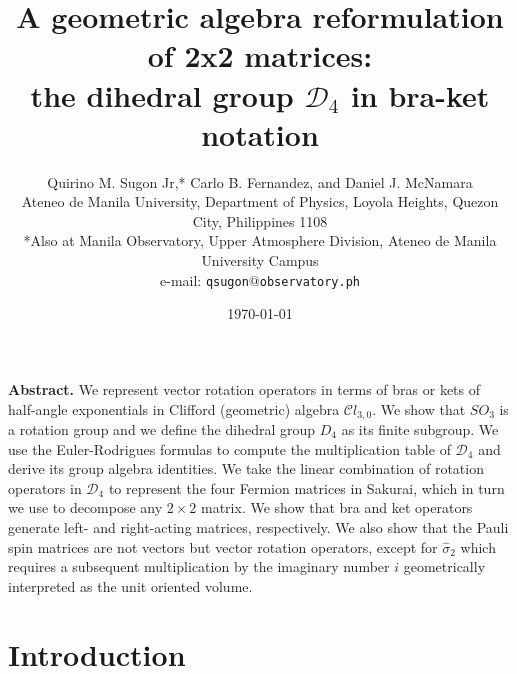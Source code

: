 \documentclass[11pt,twocolumn]{article}
\begin{document}
\title{\textsf{\textbf{A geometric algebra reformulation of 2x2 matrices:\\ the dihedral group $\mathcal D_4$ in bra-ket notation}}}
\author{Quirino M. Sugon Jr,* Carlo B. Fernandez, and Daniel J. McNamara
\smallskip\\
\small{Ateneo de Manila University, Department of Physics, Loyola Heights, Quezon City, Philippines 1108}\\
\small{*Also at Manila Observatory, Upper Atmosphere Division, Ateneo de Manila University Campus}\\
\small{e-mail: \texttt{qsugon$@$observatory.ph}}}
\date{\small{\today}}
\maketitle

\small
\section*{}\label{Abstract}
\textbf{Abstract.}  
We represent vector rotation operators in terms of bras or kets of half-angle exponentials in Clifford (geometric) algebra $\mathcal Cl_{3,0}$.  We show that $SO_3$ is a rotation group and we define the dihedral group $D_4$ as its finite subgroup. We use the Euler-Rodrigues formulas to compute the multiplication table of $\mathcal D_4$ and derive its group algebra identities.  We take the linear combination of rotation operators in $\mathcal D_4$ to represent the four Fermion matrices in Sakurai, which in turn we use to decompose any $2\times 2$ matrix.  We show that bra and ket operators generate left- and right-acting matrices, respectively.  We also show that the Pauli spin matrices are not vectors but vector rotation operators, except for $\hat\sigma_2$ which requires a subsequent multiplication by the imaginary number $i$ geometrically interpreted as the unit oriented volume.

\section{Introduction}
\end{document}
